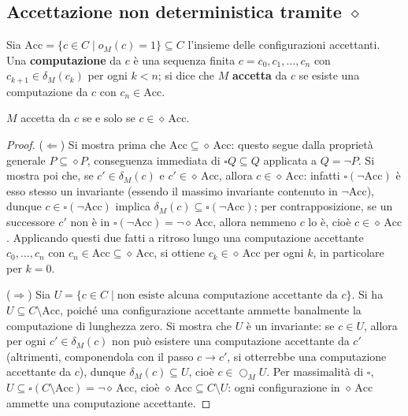 \subsection{Accettazione non deterministica tramite \(\diamond\)}
 
Sia \(\mathrm{Acc} = \{c \in C \mid o_M(c) = 1\} \subseteq C\) l'insieme delle configurazioni accettanti. Una \textbf{computazione} da \(c\) è una sequenza finita \(c = c_0, c_1, \ldots, c_n\) con \(c_{k+1} \in \delta_M(c_k)\) per ogni \(k < n\); si dice che \(M\) \textbf{accetta} da \(c\) se esiste una computazione da \(c\) con \(c_n \in \mathrm{Acc}\).
 
\begin{proposition}
  \(M\) accetta da \(c\) se e solo se \(c \in \diamond\, \mathrm{Acc}\).
\end{proposition}
 
\begin{proof}
  (\(\Leftarrow\)) Si mostra prima che \(\mathrm{Acc} \subseteq \diamond\, \mathrm{Acc}\): questo segue dalla proprietà generale \(P \subseteq \diamond P\), conseguenza immediata di \(\square Q \subseteq Q\) applicata a \(Q = \neg P\). Si mostra poi che, se \(c' \in \delta_M(c)\) e \(c' \in \diamond\,\mathrm{Acc}\), allora \(c \in \diamond\,\mathrm{Acc}\): infatti \(\square(\neg \mathrm{Acc})\) è esso stesso un invariante (essendo il massimo invariante contenuto in \(\neg \mathrm{Acc}\)), dunque \(c \in \square(\neg \mathrm{Acc})\) implica \(\delta_M(c) \subseteq \square(\neg \mathrm{Acc})\); per contrapposizione, se un successore \(c'\) non è in \(\square(\neg\mathrm{Acc}) = \neg\diamond\,\mathrm{Acc}\), allora nemmeno \(c\) lo è, cioè \(c \in \diamond\,\mathrm{Acc}\). Applicando questi due fatti a ritroso lungo una computazione accettante \(c_0, \ldots, c_n\) con \(c_n \in \mathrm{Acc} \subseteq \diamond\,\mathrm{Acc}\), si ottiene \(c_k \in \diamond\,\mathrm{Acc}\) per ogni \(k\), in particolare per \(k = 0\).
 
  (\(\Rightarrow\)) Sia \(U = \{c \in C \mid \text{non esiste alcuna computazione accettante da } c\}\). Si ha \(U \subseteq C \setminus \mathrm{Acc}\), poiché una configurazione accettante ammette banalmente la computazione di lunghezza zero. Si mostra che \(U\) è un invariante: se \(c \in U\), allora per ogni \(c' \in \delta_M(c)\) non può esistere una computazione accettante da \(c'\) (altrimenti, componendola con il passo \(c \to c'\), si otterrebbe una computazione accettante da \(c\)), dunque \(\delta_M(c) \subseteq U\), cioè \(c \in \bigcirc_M U\). Per massimalità di \(\square\), \(U \subseteq \square(C \setminus \mathrm{Acc}) = \neg\diamond\,\mathrm{Acc}\), cioè \(\diamond\,\mathrm{Acc} \subseteq C \setminus U\): ogni configurazione in \(\diamond\,\mathrm{Acc}\) ammette una computazione accettante.
\end{proof}
 
